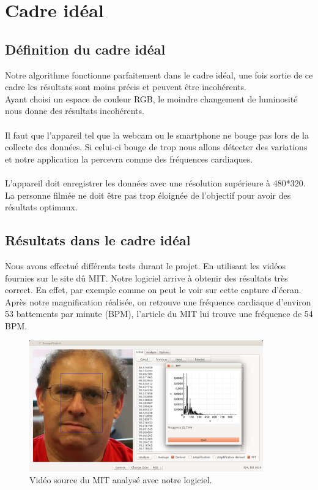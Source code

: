 \section{Cadre idéal}

\subsection{Définition du cadre idéal}
Notre algorithme fonctionne parfaitement dans le cadre idéal, une fois sortie de ce cadre les résultats sont moins précis et peuvent être incohérents. \\Ayant choisi un espace de couleur RGB, le moindre changement de luminosité nous donne des résultats incohérents. \\\\
Il faut que l'appareil tel que la webcam ou le smartphone ne bouge pas lors de la collecte des données. Si celui-ci bouge de trop nous allons détecter des variations et notre application la percevra comme des fréquences cardiaques.\\\\
L'appareil doit enregistrer les données avec une résolution supérieure à 480*320.\\
La personne filmée ne doit être pas trop éloignée de l'objectif pour avoir des résultats optimaux.

\subsection{Résultats dans le cadre idéal}
Nous avons effectué différents tests durant le projet. En utilisant les vidéos fournies sur le site dû MIT\@. Notre logiciel arrive à obtenir des
résultats très correct. En effet, par exemple comme on peut le voir sur cette capture d'écran. Après notre magnification réalisée, on retrouve
une fréquence cardiaque d'environ 53 battements par minute (BPM), l'article du MIT lui trouve une fréquence de 54 BPM\@.

\begin{figure}[h!]
	\centering
	\includegraphics[width=0.9\textwidth]{data/cas-ideal.png}
	\caption{Vidéo source du MIT analysé avec notre logiciel.}
\end{figure}

